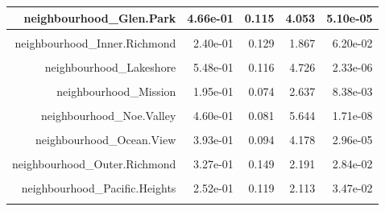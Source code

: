 \documentclass[justified, 11pt]{scrartcl}\usepackage[]{graphicx}\usepackage[]{xcolor}
\newenvironment{knitrout}{}{} %
\begin{document}
\begin{knitrout}
\begin{table}
\begin{tabular}{r|r|r|r|r}
\hline
neighbourhood\_Glen.Park & 4.66e-01 & 0.115 & 4.053 & 5.10e-05\\
\hline
\cellcolor{gray!6}{neighbourhood\_Haight.Ashbury} & \cellcolor{gray!6}{4.72e-01} & \cellcolor{gray!6}{0.101} & \cellcolor{gray!6}{4.669} & \cellcolor{gray!6}{3.07e-06}\\
\hline
neighbourhood\_Inner.Richmond & 2.40e-01 & 0.129 & 1.867 & 6.20e-02\\
\hline
\cellcolor{gray!6}{neighbourhood\_Inner.Sunset} & \cellcolor{gray!6}{3.46e-01} & \cellcolor{gray!6}{0.116} & \cellcolor{gray!6}{2.975} & \cellcolor{gray!6}{2.94e-03}\\
\hline
neighbourhood\_Lakeshore & 5.48e-01 & 0.116 & 4.726 & 2.33e-06\\
\hline
\cellcolor{gray!6}{neighbourhood\_Marina} & \cellcolor{gray!6}{2.46e-01} & \cellcolor{gray!6}{0.128} & \cellcolor{gray!6}{1.921} & \cellcolor{gray!6}{5.47e-02}\\
\hline
neighbourhood\_Mission & 1.95e-01 & 0.074 & 2.637 & 8.38e-03\\
\hline
\cellcolor{gray!6}{neighbourhood\_Nob.Hill} & \cellcolor{gray!6}{2.44e-01} & \cellcolor{gray!6}{0.106} & \cellcolor{gray!6}{2.306} & \cellcolor{gray!6}{2.11e-02}\\
\hline
neighbourhood\_Noe.Valley & 4.60e-01 & 0.081 & 5.644 & 1.71e-08\\
\hline
\cellcolor{gray!6}{neighbourhood\_North.Beach} & \cellcolor{gray!6}{2.54e-01} & \cellcolor{gray!6}{0.121} & \cellcolor{gray!6}{2.105} & \cellcolor{gray!6}{3.53e-02}\\
\hline
neighbourhood\_Ocean.View & 3.93e-01 & 0.094 & 4.178 & 2.96e-05\\
\hline
\cellcolor{gray!6}{neighbourhood\_Outer.Mission} & \cellcolor{gray!6}{3.36e-01} & \cellcolor{gray!6}{0.086} & \cellcolor{gray!6}{3.924} & \cellcolor{gray!6}{8.78e-05}\\
\hline
neighbourhood\_Outer.Richmond & 3.27e-01 & 0.149 & 2.191 & 2.84e-02\\
\hline
\cellcolor{gray!6}{neighbourhood\_Outer.Sunset} & \cellcolor{gray!6}{3.18e-01} & \cellcolor{gray!6}{0.129} & \cellcolor{gray!6}{2.468} & \cellcolor{gray!6}{1.36e-02}\\
\hline
neighbourhood\_Pacific.Heights & 2.52e-01 & 0.119 & 2.113 & 3.47e-02\\
\hline
\cellcolor{gray!6}{neighbourhood\_Parkside} & \cellcolor{gray!6}{3.06e-01} & \cellcolor{gray!6}{0.122} & \cellcolor{gray!6}{2.507} & \cellcolor{gray!6}{1.22e-02}\\

\end{tabular}
\end{table}
\end{knitrout}
\end{document}
